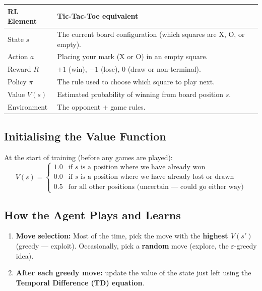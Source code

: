 \documentclass[11pt,a4paper]{article}
\begin{document}
\begin{tcolorbox}[defn={Mapping Tic-Tac-Toe to RL Elements}]
\begin{tabular}{p{3cm}p{11cm}}
\toprule
\textbf{RL Element} & \textbf{Tic-Tac-Toe equivalent} \\
\midrule
State $s$ & The current board configuration (which squares are X, O, or empty). \\
Action $a$ & Placing your mark (X or O) in an empty square. \\
Reward $R$ & $+1$ (win), $-1$ (lose), $0$ (draw or non-terminal). \\
Policy $\pi$ & The rule used to choose which square to play next. \\
Value $V(s)$ & Estimated probability of winning from board position $s$. \\
Environment & The opponent + game rules. \\
\bottomrule
\end{tabular}
\end{tcolorbox}

\subsection*{Initialising the Value Function}
At the start of training (before any games are played):
\[
  V(s) = \begin{cases}
    1.0 & \text{if } s \text{ is a position where we have already won} \\
    0.0 & \text{if } s \text{ is a position where we have already lost or drawn} \\
    0.5 & \text{for all other positions (uncertain — could go either way)}
  \end{cases}
\]

\subsection*{How the Agent Plays and Learns}
\begin{enumerate}
  \item \textbf{Move selection:} Most of the time, pick the move with the \textbf{highest $V(s')$}
    (greedy — exploit). Occasionally, pick a \textbf{random} move (explore, the $\varepsilon$-greedy idea).
  \item \textbf{After each greedy move:} update the value of the state just left using the
    \textbf{Temporal Difference (TD) equation}.
\end{enumerate}
\end{document}
